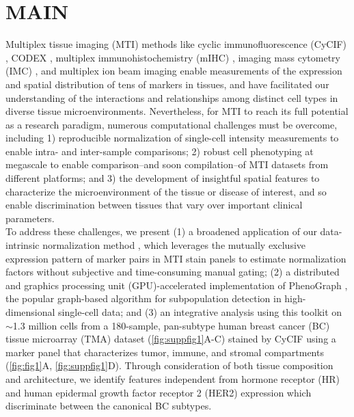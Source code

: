 \documentclass[preprint,review,3p,12pt]{elsarticle}
\begin{document}
\linenumbers

\section{MAIN}
\label{S:1}
Multiplex tissue imaging (MTI) methods like cyclic  immunofluorescence (CyCIF) \cite{cycif2018, cmif2020}, CODEX \cite{codex2018}, multiplex immunohistochemistry (mIHC) \cite{mIHC2017}, imaging mass cytometry (IMC) \cite{imc2014}, and multiplex ion beam imaging \cite{mibi2014} enable measurements of the expression and spatial distribution of tens of markers in tissues, and have facilitated our understanding of the interactions and relationships among distinct cell types in diverse tissue microenvironments. Nevertheless, for MTI to reach its full potential as a research paradigm, numerous computational challenges must be overcome, including 1) reproducible normalization of single-cell intensity measurements to enable intra- and inter-sample comparisons; 2) robust cell phenotyping at megascale to enable comparison--and soon compilation--of MTI datasets from different platforms; and 3) the development of insightful spatial features to characterize the microenvironment of the tissue or disease of interest, and so enable discrimination between tissues that vary over important clinical parameters.\\

To address these challenges, we present (1) a broadened application of our data-intrinsic normalization method \cite{Chang2020}, which leverages the mutually exclusive expression pattern of marker pairs in MTI stain panels to estimate normalization factors without subjective and time-consuming manual gating; (2) a distributed and graphics processing unit (GPU)-accelerated implementation of PhenoGraph \cite{Levine2015}, the popular graph-based algorithm for subpopulation detection in high-dimensional single-cell data; and (3) an integrative analysis using this toolkit on $\sim$1.3 million cells from a 180-sample, pan-subtype human breast cancer (BC) tissue microarray (TMA) dataset (\autoref{fig:suppfig1}A-C) stained by CyCIF using a marker panel that characterizes tumor, immune, and stromal compartments (\autoref{fig:fig1}A, \autoref{fig:suppfig1}D). Through consideration of both tissue composition and architecture, we identify features independent from hormone receptor (HR) and human epidermal growth factor receptor 2 (HER2) expression which discriminate between the canonical BC subtypes.\\
\end{document}
